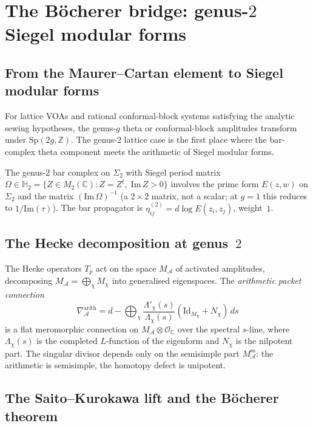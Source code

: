 \documentclass[11pt,reqno]{amsart}
\theoremstyle{definition}
\theoremstyle{remark}
\providecommand{\cA}{\mathcal{A}}
\providecommand{\cO}{\mathcal{O}}
\providecommand{\bC}{\mathbb{C}}
\providecommand{\bZ}{\mathbb{Z}}
\providecommand{\HHH}{\mathbb{H}}
\providecommand{\Sp}{\mathrm{Sp}}
\providecommand{\Id}{\mathrm{Id}}
\numberwithin{equation}{section}
\begin{document}
\section{The B\"ocherer bridge: genus-$2$ Siegel modular forms}
\label{sec:bocherer}

\subsection{From the Maurer--Cartan element to Siegel modular forms}

For lattice VOAs and rational conformal-block systems satisfying the
analytic sewing hypotheses, the genus-$g$ theta or conformal-block
amplitudes transform under $\Sp(2g,\bZ)$. The genus-$2$ lattice case
is the first place where the bar-complex theta component meets the
arithmetic of Siegel modular forms.

The genus-$2$ bar complex on $\Sigma_2$ with Siegel period matrix
$\Omega \in \HHH_2 = \{Z \in M_2(\bC) : Z = Z^t,\;
\mathrm{Im}\,Z > 0\}$ involves the prime form $E(z,w)$ on
$\Sigma_2$ and the matrix $(\mathrm{Im}\,\Omega)^{-1}$ (a $2 \times 2$
matrix, not a scalar; at $g = 1$ this reduces to
$1/\mathrm{Im}(\tau)$). The bar propagator is
$\eta^{(2)}_{ij} = d\log E(z_i, z_j)$, weight~$1$.

\subsection{The Hecke decomposition at genus~$2$}

The Hecke operators $T_p$ act on the space $M_\cA$ of activated
amplitudes, decomposing
$M_\cA = \bigoplus_\chi M_\chi$
into generalised eigenspaces. The \emph{arithmetic packet connection}
\begin{equation}\label{eq:arith-packet}
  \nabla^{\mathrm{arith}}_\cA
  = d - \bigoplus_\chi
  \frac{\Lambda'_\chi(s)}{\Lambda_\chi(s)}
  (\Id_{M_\chi} + N_\chi)\,ds
\end{equation}
is a flat meromorphic connection on $M_\cA \otimes \cO_\bC$ over
the spectral $s$-line, where $\Lambda_\chi(s)$ is the completed
$L$-function of the eigenform and $N_\chi$ is the nilpotent part.
The singular divisor depends only on the semisimple part
$M^{\mathrm{ss}}_\cA$: the arithmetic is semisimple, the homotopy
defect is unipotent.

\subsection{The Saito--Kurokawa lift and the B\"ocherer theorem}
\end{document}
